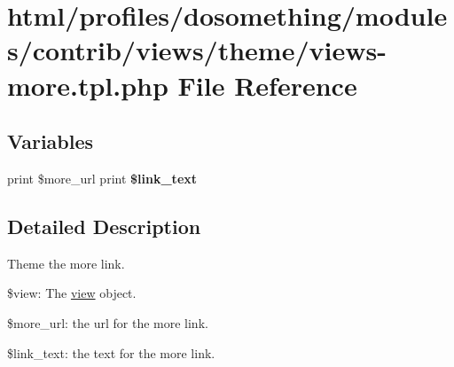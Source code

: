 \hypertarget{views-more_8tpl_8php}{
\section{html/profiles/dosomething/modules/contrib/views/theme/views-\/more.tpl.php File Reference}
\label{views-more_8tpl_8php}
}
\subsection*{Variables}
\begin{DoxyCompactItemize}
\item 
\hypertarget{views-more_8tpl_8php_ad8e91f0b148a1a82b33776a9b908f09f}{
print \$more\_\-url print {\bfseries \$link\_\-text}}
\label{views-more_8tpl_8php_ad8e91f0b148a1a82b33776a9b908f09f}

\end{DoxyCompactItemize}


\subsection{Detailed Description}
Theme the more link.


\begin{DoxyItemize}
\item \$view: The \hyperlink{classview}{view} object.
\item \$more\_\-url: the url for the more link.
\item \$link\_\-text: the text for the more link. 
\end{DoxyItemize}